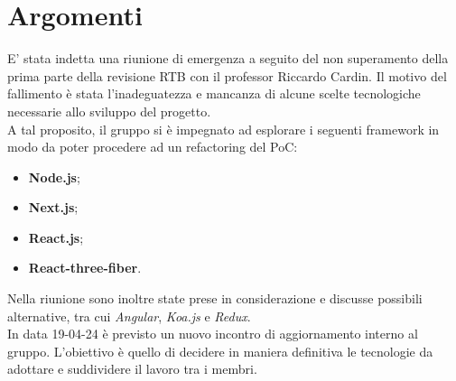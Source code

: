 \section{Argomenti} \label{sec:argomenti}
E' stata indetta una riunione di emergenza a seguito del non superamento della prima parte della revisione RTB con il professor Riccardo Cardin.
Il motivo del fallimento è stata l'inadeguatezza e mancanza di alcune scelte tecnologiche necessarie allo sviluppo del progetto.
\\

\noindent A tal proposito, il gruppo si è impegnato ad esplorare i seguenti framework in modo da poter procedere ad un refactoring del PoC:
\begin{itemize}
    \item \textbf{Node.js};
    \item \textbf{Next.js};
    \item \textbf{React.js};
    \item \textbf{React-three-fiber}.
\end{itemize}
Nella riunione sono inoltre state prese in considerazione e discusse possibili alternative, tra cui \textit{Angular}, \textit{Koa.js} e \textit{Redux}.
\\

\noindent In data 19-04-24 è previsto un nuovo incontro di aggiornamento interno al gruppo. L'obiettivo è quello di decidere in maniera definitiva le tecnologie da adottare e suddividere il lavoro tra i membri.